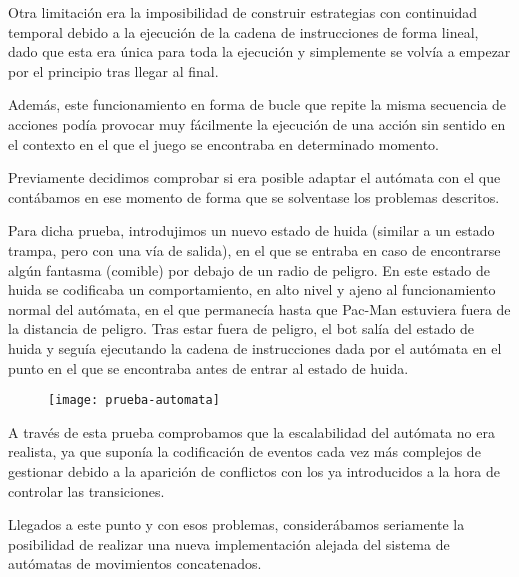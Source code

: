 Otra limitación era la imposibilidad de construir estrategias con continuidad temporal debido a la ejecución de la cadena de instrucciones de forma lineal, dado que esta era única para toda la ejecución y simplemente se volvía a empezar por el principio tras llegar al final.
 
Además, este funcionamiento en forma de bucle que repite la misma secuencia de acciones podía provocar muy fácilmente la ejecución de una acción sin sentido en el contexto en el que el juego se encontraba en determinado momento.
 
Previamente decidimos comprobar si era posible adaptar el autómata con el que contábamos en ese momento de forma que se solventase los problemas descritos.
 
Para dicha prueba, introdujimos un nuevo estado de huida (similar a un estado trampa, pero con una vía de salida), en el que se entraba en caso de encontrarse algún fantasma (comible) por debajo de un radio de peligro. 
En este estado de huida se codificaba un comportamiento, en alto nivel y ajeno al funcionamiento normal del autómata, en el que permanecía hasta que Pac-Man estuviera fuera de la distancia de peligro. Tras estar fuera de peligro, el bot salía del estado de huida y seguía ejecutando la cadena de instrucciones dada por el autómata en el punto en el que se encontraba antes de entrar al estado de huida.
\begin{figure}[H]
\centering
\texttt{[image: prueba-automata]}
\end{figure}

A través de esta prueba comprobamos que la escalabilidad del autómata no era realista, ya que suponía la codificación de eventos cada vez más complejos de gestionar debido a la aparición de conflictos con los ya introducidos a la hora de controlar las transiciones.
 
Llegados a este punto y con esos problemas, considerábamos seriamente la posibilidad de realizar una nueva implementación alejada del sistema de autómatas de movimientos concatenados.

